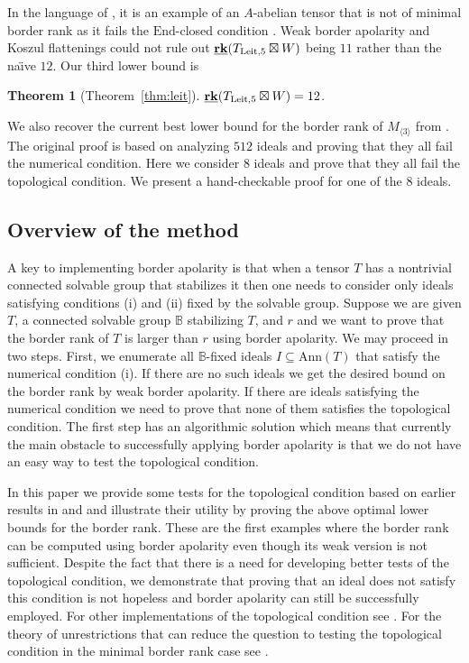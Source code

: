 \documentclass[12pt]{amsart}
\newtheorem{theorem}{Theorem}[section]
\theoremstyle{definition}
\theoremstyle{remark}
\theoremstyle{definition}
\newcommand{\brk}{{\underline{{\bf rk}}}}
\newcommand{\Ann}{\mathrm{Ann}}
\begin{document}
In the language of \cite{LM17}, it is an example of an $A$-abelian tensor that is not of minimal border rank as it fails the $\mathrm{End}$-closed condition \cite{LM08}.
Weak border apolarity and Koszul flattenings could not rule out $\brk(T_{\mathrm{Leit},{5}}\boxtimes W)$ being $11$ rather than the na\"\i ve $12$. Our third lower bound is
\begin{theorem}[Theorem~\ref{thm:leit}]
$\brk(T_{\mathrm{Leit},{5}}\boxtimes W) = 12$.
\end{theorem}


We also recover the current best lower bound for the border rank of $M_{\langle 3\rangle}$ from \cite{chl19}.
The original proof is based on analyzing $512$ ideals and proving that they all fail the numerical condition.
Here we consider $8$ ideals and prove that they all fail the topological condition. We present a hand-checkable proof for one of the $8$ ideals.


\subsection{Overview of the method}
A key to implementing border apolarity is that when a tensor $T$ has a nontrivial connected solvable group that stabilizes it
   then one needs to consider only ideals satisfying conditions (i) and (ii)
   fixed by the solvable group. Suppose we are given $T$, a connected solvable group $\mathbb{B}$ stabilizing $T$,  and $r$ and we want to prove that the border rank of $T$ is larger than $r$ using border apolarity. We may proceed in two steps. First, we enumerate all $\mathbb{B}$-fixed ideals $I\subseteq \Ann(T)$ that satisfy the numerical condition (i). If there are no such ideals we get the desired bound on the border rank by weak border apolarity. If there are ideals satisfying the numerical condition we need to prove that none of them satisfies the topological condition.
The first step has an algorithmic solution \cite{chl19} which means that currently the main obstacle to successfully applying border apolarity is that we do not have an easy way to test the topological condition. 

In this paper we provide some tests for the topological condition based on earlier results in \cite{Man22} and \cite{Man23} and illustrate their utility by  proving the above optimal lower bounds for the border rank. These are the first examples where the border rank can be computed using border apolarity even though its weak version is not sufficient. Despite the fact that there is a need for developing better tests of the topological condition, we demonstrate that proving that an ideal does not satisfy this condition is not hopeless and border apolarity can still be successfully employed. For other implementations of the topological condition see \cite{JM25}. For the theory of unrestrictions that can reduce the question to testing the topological condition in the minimal border rank case see \cite{JJ26}.
\end{document}
